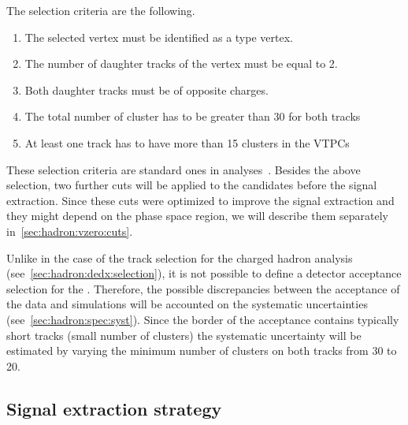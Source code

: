The \vzero selection criteria are the following.
\begin{enumerate}[label=(\roman*)]
\item The selected vertex must be identified as a \vzero type vertex.
\item The number of daughter tracks of the vertex must be equal to 2.
\item Both daughter tracks must be of opposite charges.
\item The total number of cluster has to be greater than 30 for both tracks
\item At least one track has to have more than 15 clusters in the VTPCs
\end{enumerate}
These selection criteria are standard ones
in \NASixtyOne analyses~\cite{Aduszkiewicz:2015dmr,Abgrall:2015hmv}.
Besides the above selection, two further \vzero cuts will be applied
to the \vzero candidates before the signal extraction. Since
these cuts were optimized to improve the signal extraction and they might
depend on the phase space region, we will describe them separately
in~\cref{sec:hadron:vzero:cuts}.

Unlike in the case of the track selection for the charged hadron
analysis (see~\cref{sec:hadron:dedx:selection}),
it is not possible to define a detector acceptance selection for
the \vzeros. Therefore, the possible discrepancies between
the acceptance of the data and simulations
will be accounted on the systematic uncertainties (see~\cref{sec:hadron:spec:syst}).
Since the border of the acceptance contains typically short tracks
(small number of clusters)
the systematic uncertainty will be estimated by varying the minimum number
of clusters on both tracks from 30 to 20. 

\subsection{\boldmath Signal extraction strategy}
\label{sec:hadron:vzero:signal}

